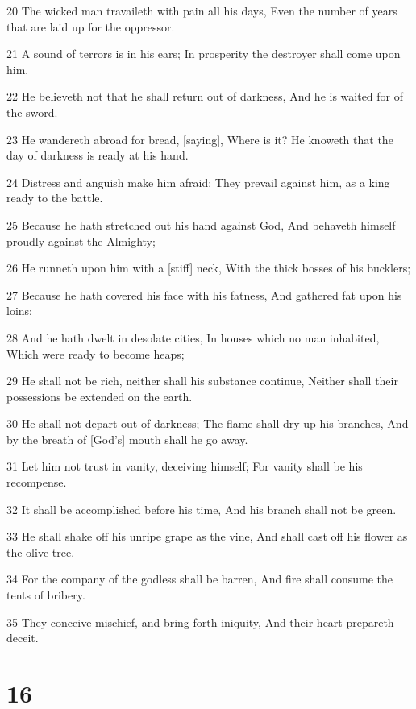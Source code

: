 \par 20 The wicked man travaileth with pain all his days, Even the number of years that are laid up for the oppressor.
\par 21 A sound of terrors is in his ears; In prosperity the destroyer shall come upon him.
\par 22 He believeth not that he shall return out of darkness, And he is waited for of the sword.
\par 23 He wandereth abroad for bread, [saying], Where is it? He knoweth that the day of darkness is ready at his hand.
\par 24 Distress and anguish make him afraid; They prevail against him, as a king ready to the battle.
\par 25 Because he hath stretched out his hand against God, And behaveth himself proudly against the Almighty;
\par 26 He runneth upon him with a [stiff] neck, With the thick bosses of his bucklers;
\par 27 Because he hath covered his face with his fatness, And gathered fat upon his loins;
\par 28 And he hath dwelt in desolate cities, In houses which no man inhabited, Which were ready to become heaps;
\par 29 He shall not be rich, neither shall his substance continue, Neither shall their possessions be extended on the earth.
\par 30 He shall not depart out of darkness; The flame shall dry up his branches, And by the breath of [God's] mouth shall he go away.
\par 31 Let him not trust in vanity, deceiving himself; For vanity shall be his recompense.
\par 32 It shall be accomplished before his time, And his branch shall not be green.
\par 33 He shall shake off his unripe grape as the vine, And shall cast off his flower as the olive-tree.
\par 34 For the company of the godless shall be barren, And fire shall consume the tents of bribery.
\par 35 They conceive mischief, and bring forth iniquity, And their heart prepareth deceit.

\chapter{16}

